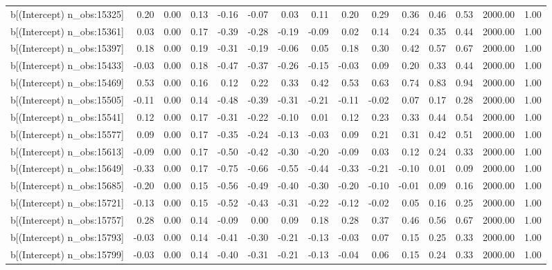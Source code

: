 \begin{table}[ht]
\begin{tabular}{rrrrrrrrrrrrrrr}
  b[(Intercept) n\_obs:15325] & 0.20 & 0.00 & 0.13 & -0.16 & -0.07 & 0.03 & 0.11 & 0.20 & 0.29 & 0.36 & 0.46 & 0.53 & 2000.00 & 1.00 \\ 
  b[(Intercept) n\_obs:15361] & 0.03 & 0.00 & 0.17 & -0.39 & -0.28 & -0.19 & -0.09 & 0.02 & 0.14 & 0.24 & 0.35 & 0.44 & 2000.00 & 1.00 \\ 
  b[(Intercept) n\_obs:15397] & 0.18 & 0.00 & 0.19 & -0.31 & -0.19 & -0.06 & 0.05 & 0.18 & 0.30 & 0.42 & 0.57 & 0.67 & 2000.00 & 1.00 \\ 
  b[(Intercept) n\_obs:15433] & -0.03 & 0.00 & 0.18 & -0.47 & -0.37 & -0.26 & -0.15 & -0.03 & 0.09 & 0.20 & 0.33 & 0.44 & 2000.00 & 1.00 \\ 
  b[(Intercept) n\_obs:15469] & 0.53 & 0.00 & 0.16 & 0.12 & 0.22 & 0.33 & 0.42 & 0.53 & 0.63 & 0.74 & 0.83 & 0.94 & 2000.00 & 1.00 \\ 
  b[(Intercept) n\_obs:15505] & -0.11 & 0.00 & 0.14 & -0.48 & -0.39 & -0.31 & -0.21 & -0.11 & -0.02 & 0.07 & 0.17 & 0.28 & 2000.00 & 1.00 \\ 
  b[(Intercept) n\_obs:15541] & 0.12 & 0.00 & 0.17 & -0.31 & -0.22 & -0.10 & 0.01 & 0.12 & 0.23 & 0.33 & 0.44 & 0.54 & 2000.00 & 1.00 \\ 
  b[(Intercept) n\_obs:15577] & 0.09 & 0.00 & 0.17 & -0.35 & -0.24 & -0.13 & -0.03 & 0.09 & 0.21 & 0.31 & 0.42 & 0.51 & 2000.00 & 1.00 \\ 
  b[(Intercept) n\_obs:15613] & -0.09 & 0.00 & 0.17 & -0.50 & -0.42 & -0.30 & -0.20 & -0.09 & 0.03 & 0.12 & 0.24 & 0.33 & 2000.00 & 1.00 \\ 
  b[(Intercept) n\_obs:15649] & -0.33 & 0.00 & 0.17 & -0.75 & -0.66 & -0.55 & -0.44 & -0.33 & -0.21 & -0.10 & 0.01 & 0.09 & 2000.00 & 1.00 \\ 
  b[(Intercept) n\_obs:15685] & -0.20 & 0.00 & 0.15 & -0.56 & -0.49 & -0.40 & -0.30 & -0.20 & -0.10 & -0.01 & 0.09 & 0.16 & 2000.00 & 1.00 \\ 
  b[(Intercept) n\_obs:15721] & -0.13 & 0.00 & 0.15 & -0.52 & -0.43 & -0.31 & -0.22 & -0.12 & -0.02 & 0.05 & 0.16 & 0.25 & 2000.00 & 1.00 \\ 
  b[(Intercept) n\_obs:15757] & 0.28 & 0.00 & 0.14 & -0.09 & 0.00 & 0.09 & 0.18 & 0.28 & 0.37 & 0.46 & 0.56 & 0.67 & 2000.00 & 1.00 \\ 
  b[(Intercept) n\_obs:15793] & -0.03 & 0.00 & 0.14 & -0.41 & -0.30 & -0.21 & -0.13 & -0.03 & 0.07 & 0.15 & 0.25 & 0.33 & 2000.00 & 1.00 \\ 
  b[(Intercept) n\_obs:15799] & -0.03 & 0.00 & 0.14 & -0.40 & -0.31 & -0.21 & -0.13 & -0.04 & 0.06 & 0.15 & 0.24 & 0.33 & 2000.00 & 1.00 \\ 

\end{tabular}
\end{table}
